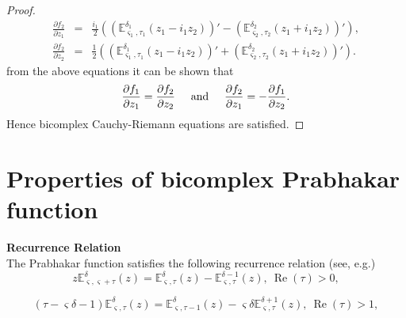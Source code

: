 \documentclass[a4paper,12pt]{article}
\theoremstyle{remark}
\begin{document}
\begin{proof}
\begin{eqnarray}
	\frac{\partial f_2}{\partial z_1 }&=&\frac{i_1}{2}\left(\left(  \mathbb{E}^{\delta_1}_{ \varsigma_1,\tau_1}(z_1 - i_1z_2)\right) '-\left( \mathbb{E}^{\delta_2}_{ \varsigma_2,\tau_2}(z_1 +  i_1z_2)\right)'\right) ,\nonumber\\
	\frac{\partial f_2}{\partial z_2 }&=&\frac{1}{2}\left(\left(  \mathbb{E}^{\delta_1}_{ \varsigma_1,\tau_1}(z_1 - i_1z_2)\right) '+\left( \mathbb{E}^{\delta_2}_{ \varsigma_2,\tau_2}(z_1 +  i_1z_2)\right)'\right) .\nonumber 
	\end{eqnarray}
	from the above equations it can be shown that
	\begin{equation}
	\frac{\partial f_1}{\partial z_1} = \frac{\partial f_2}{\partial z_2} \hspace{5mm}\text{and} \hspace{5mm}
	\frac{\partial f_2}{\partial z_1} = - \frac{\partial f_1}{\partial z_2}.
	\end{equation}
Hence bicomplex Cauchy-Riemann equations are satisfied.
\end{proof}
\section{Properties of bicomplex Prabhakar function}


\noindent\textbf{Recurrence Relation}\\
The Prabhakar function satisfies the following recurrence relation  (see, e.g.\cite[p.272]{G})
\begin{equation}\label{eq: p rec}
z\mathbb{E}^\delta_{ \varsigma, \varsigma+\tau}(z)=\mathbb{E}^\delta_{ \varsigma,\tau}(z)-\mathbb{E}^{\delta-1}_{ \varsigma,\tau}(z),~\operatorname{Re}(\tau)>0,
\end{equation}


\begin{equation}\label{eq:p3}
(\tau- \varsigma\delta-1)\mathbb{E}^{\delta}_{ \varsigma,\tau}(z)=\mathbb{E}^{\delta}_{ \varsigma,\tau-1}(z)- \varsigma\delta\mathbb{E}^{\delta+1}_{ \varsigma,\tau}(z),~\operatorname{Re}(\tau)>1,
\end{equation}
\end{document}
